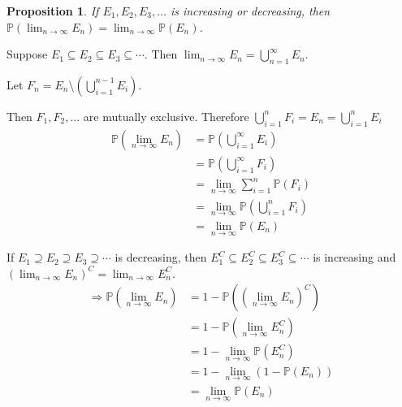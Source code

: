 \documentclass[a4paper,11pt]{amsbook}
\makeatletter
\renewenvironment{proof}[1][\proofname]{\par
    \pushQED{\qed}%
    \normalfont \topsep6\p@\@plus6\p@\relax
    \trivlist
    \itemindent\z@ %
    \item[\hskip\labelsep
          \scshape
      #1\@addpunct{.}]\ignorespaces
}{%
    \popQED\endtrivlist\@endpefalse
}
\newtheorem{proposition}{\hspace{-2em} \color{darkblue} Proposition}[chapter]
\theoremstyle{definition}
\theoremstyle{remark}
\renewcommand{\P}{\mathbb{P}}
\newcommand\inc\subseteq
\newcommand\cni\supseteq
\newcommand\exc\setminus
\newcommand\0{\varnothing}
\makeatother
\begin{document}
    \begin{proposition}
        If $E_1,E_2,E_3,\ldots$ is increasing or decreasing, then $\P\left(\lim_{n\to\infty} E_n\right)=\lim_{n\to\infty}\P(E_n)$.
    \end{proposition}
    \begin{proof}
        Suppose $E_1\inc E_2\inc E_3\inc\cdots$. Then $\lim_{n\to\infty} E_n=\bigcup_{n=1}^\infty E_n$.
        \begin{center}
        \end{center}

        Let $F_n=E_n\exc\left(\bigcup_{i=1}^{n-1}E_i\right)$.

        Then $F_1,F_2,\ldots$ are mutually exclusive.
        Therefore $\bigcup_{i=1}^nF_i=E_n=\bigcup_{i=1}^nE_i$
        \begin{align*}
            \P\left(\lim_{n\to\infty} E_n\right)&=\P\left(\bigcup_{i=1}^\infty E_i\right) \\
            &=\P\left(\bigcup_{i=1}^\infty F_i\right) \tag{Axiom 3} \\
            &=\lim_{n\to\infty}\sum_{i=1}^n\P(F_i) \tag{def. of infinite sum}\\
            &=\lim_{n\to\infty}\P\left(\bigcup_{i=1}^nF_i\right) \tag{Axiom 3}\\
            &=\lim_{n\to\infty}\P(E_n)
        \end{align*}

        If $E_1\cni E_2\cni E_3\cni\cdots$ is decreasing, then $E_1^C\inc E_2^C\inc E_3^C\inc\cdots$ is increasing
        and $\left(\lim_{n\to\infty}E_n\right)^C=\lim_{n\to\infty}E_n^C$.
        \begin{align*}
            \Rightarrow\P\left(\lim_{n\to\infty}E_n\right)&=1-\P\left(\left(\lim_{n\to\infty}E_n\right)^C\right) \\
            &=1-\P\left(\lim_{n\to\infty}E_n^C\right) \\
            &=1-\lim_{n\to\infty}\P(E_n^C) \tag{above result} \\
            &=1-\lim_{n\to\infty}(1-\P(E_n)) \\
            &=\lim_{n\to\infty}\P(E_n)
        \end{align*}
    \end{proof}
\end{document}
